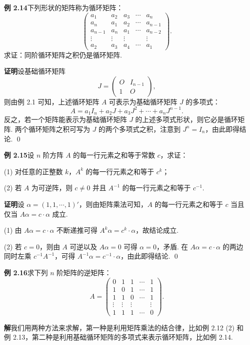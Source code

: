 \documentclass[UTF8, 12pt, fontset=fandol, oneside]{ctexart}
\begin{document}
\noindent\textbf{例 2.14}\quad 下列形状的矩阵称为循环矩阵：
\[
\left(
\begin{array}{ccccc}
a_1 & a_2 & a_3 & \cdots & a_n\\
a_n & a_1 & a_2 & \cdots & a_{n-1}\\
a_{n-1} & a_n & a_1 & \cdots & a_{n-2}\\
\vdots & \vdots & \vdots & & \vdots\\
a_2 & a_3 & a_4 & \cdots & a_1
\end{array}
\right).
\]
求证：同阶循环矩阵之积仍是循环矩阵.

\noindent\textbf{证明}\quad 设基础循环矩阵
\[
J=
\left(
\begin{array}{cc}
O & I_{n-1}\\
1 & O
\end{array}
\right),
\]
则由例 2.1 可知，上述循环矩阵 $A$ 可表示为基础循环矩阵 $J$ 的多项式：
\[
A=a_1I_n+a_2J+a_3J^2+\cdots+a_nJ^{n-1}.
\]
反之，若一个矩阵能表示为基础循环矩阵 $J$ 的上述多项式形状，则它必是循环矩阵. 两个循环矩阵之积可写为 $J$ 的两个多项式之积，注意到 $J^n=I_n$，由此即得结论. \qed

\noindent\textbf{例 2.15}\quad 设 $n$ 阶方阵 $A$ 的每一行元素之和等于常数 $c$，求证：

(1) 对任意的正整数 $k$，$A^k$ 的每一行元素之和等于 $c^k$；

(2) 若 $A$ 为可逆阵，则 $c\ne0$ 并且 $A^{-1}$ 的每一行元素之和等于 $c^{-1}$.

\noindent\textbf{证明}\quad 设 $\alpha=(1,1,\cdots,1)'$，则由矩阵乘法可知，$A$ 的每一行元素之和等于 $c$ 当且仅当 $A\alpha=c\cdot\alpha$ 成立.

(1) 由 $A\alpha=c\cdot\alpha$ 不断递推可得 $A^k\alpha=c^k\cdot\alpha$，故结论成立.

(2) 若 $c=0$，则由 $A$ 可逆以及 $A\alpha=0$ 可得 $\alpha=0$，矛盾. 在 $A\alpha=c\cdot\alpha$ 的两边同时左乘 $c^{-1}A^{-1}$，可得 $A^{-1}\alpha=c^{-1}\cdot\alpha$，由此即得结论. \qed

\noindent\textbf{例 2.16}\quad 求下列 $n$ 阶矩阵的逆矩阵：
\[
A=
\left(
\begin{array}{ccccc}
0 & 1 & 1 & \cdots & 1\\
1 & 0 & 1 & \cdots & 1\\
1 & 1 & 0 & \cdots & 1\\
\vdots & \vdots & \vdots & & \vdots\\
1 & 1 & 1 & \cdots & 0
\end{array}
\right).
\]

\noindent\textbf{解}\quad 我们用两种方法来求解，第一种是利用矩阵乘法的结合律，比如例 2.12 (2) 和例 2.13，第二种是利用基础循环矩阵的多项式来表示循环矩阵，比如例 2.14.
\end{document}
